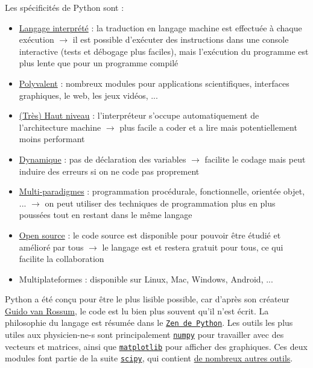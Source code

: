 \documentclass{article}
\begin{document}
Les spécificités de Python sont :
\begin{itemize}
    \item \href{https://fr.wikipedia.org/wiki/Interpr\%C3\%A8te_(informatique)}{Langage interprété} :
    la traduction en langage machine est effectuée à chaque exécution $\to$ il est possible d'exécuter des instructions dans une console interactive (tests et débogage plus faciles), mais l'exécution du programme est plus lente que pour un programme compilé
    \item \href{https://en.wikipedia.org/wiki/List_of_Python_software}{Polyvalent} :
    nombreux modules pour applications scientifiques, interfaces graphiques, le web, les jeux vidéos, ...
    \item \href{https://fr.wikipedia.org/wiki/Langage_de_haut_niveau}{(Très) Haut niveau} :
    l'interpréteur s'occupe automatiquement de l'architecture machine $\to$ plus facile a coder et a lire mais potentiellement moins performant
    \item \href{https://fr.wikipedia.org/wiki/Langage_de_programmation_dynamique}{Dynamique} :
    pas de déclaration des variables $\to$ facilite le codage mais peut induire des erreurs si on ne code pas proprement
    \item \href{https://fr.wikipedia.org/wiki/Paradigme_(programmation)}{Multi-paradigmes} : programmation procédurale, fonctionnelle, orientée objet, ... $\to$ on peut utiliser des techniques de programmation plus en plus poussées tout en restant dans le même langage
    \item \href{https://fr.wikipedia.org/wiki/Licence_libre}{Open source} :
    le code source est disponible pour pouvoir être étudié et amélioré par tous $\to$ le langage est et restera gratuit pour tous, ce qui facilite la collaboration
    \item Multiplateformes : disponible sur Linux, Mac, Windows, Android, ...
\end{itemize}

Python a été conçu pour être le plus lisible possible, car d'après son créateur \href{https://fr.wikipedia.org/wiki/Guido_van_Rossum}{Guido van Rossum}, le code est lu bien plus souvent qu'il n'est écrit. La philosophie du langage est résumée dans le \href{https://fr.wikipedia.org/wiki/Zen_de_Python}{\texttt{Zen de Python}}.
Les outils les plus utiles aux physicien-ne-s sont principalement \href{http://www.numpy.org/}{\texttt{numpy}} pour travailler avec des vecteurs et matrices, ainsi que \href{https://matplotlib.org/}{\texttt{matplotlib}} pour afficher des graphiques. Ces deux modules font partie de la suite \href{https://scipy.org/about.html}{\texttt{scipy}}, qui contient \href{https://docs.scipy.org/doc/scipy/reference/index.html}{de nombreux autres outils}.
\end{document}
